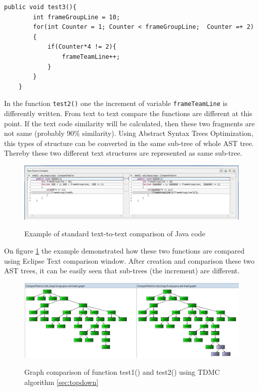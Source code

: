 \documentclass{report}
\begin{document}
\begin{lstlisting}[caption= {Normalized function \texttt{test3()} concerning variable \texttt {frameGroupLine}}, label = listing1]
	public void test3(){
		int frameGroupLine = 10;
		for(int Counter = 1; Counter < frameGroupLine;  Counter =+ 2)
		{
			if(Counter*4 != 2){ 
				frameTeamLine++;
			}
		}
	}
\end{lstlisting}

In the function \texttt{test2()} one the increment of variable \texttt{frameTeamLine} is differently written. From text to text compare the functions are different at this point. If the text code similarity will be calculated, then these two fragments are not same (probably $90\%$ similarity). Using Abstract Syntax Trees Optimization, this types of structure can be converted in the same sub-tree of whole AST tree. Thereby these two different text structures are represented as same sub-tree. 

\vspace{4mm}

\begin{figure}[h]
  \centering
  \includegraphics[width=1.00\textwidth]{Figures/AST-optimization/text-to-text-compare}\\[0.1cm]
  \caption[Text to text comparison example]{Example of standard text-to-text comparison of Java code}
  \label{fig:text-to-text-compare}
\end{figure}

On figure \ref{fig:text-to-text-compare} the example demonstrated how these two functions are compared using Eclipse Text comparison window. After creation and comparison these two AST trees, it can be easily seen that sub-trees (the increment) are different.

\begin{figure}[h]
  \centering
  \includegraphics[width=1.00\textwidth]{Figures/AST-optimization/tree-compared1}\\[0.1cm]
  \caption[Graph comparison on similar AST trees]{Graph comparison of function test1() and test2() using TDMC algorithm \ref{sec:topdown}}
  \label{fig:ast-graph-compare-similar-tdmc}
\end{figure}
\end{document}
